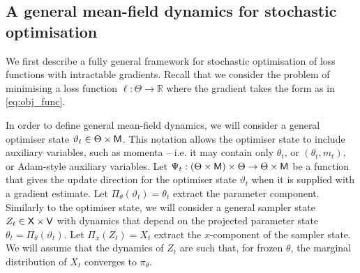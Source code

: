 \subsection{A general mean-field dynamics for stochastic optimisation}
We first describe a fully general framework for stochastic optimisation of loss functions with intractable gradients. Recall that we consider the problem of minimising a loss function $\ell:\Theta\rightarrow\mathbb{R}$ where the gradient takes the form as in \eqref{eq:obj_func}.

In order to define general mean-field dynamics, we will consider a general optimiser state $\vartheta_t \in \Theta \times {\mathsf{M}}$. This notation allows the optimiser state to include auxiliary variables, such as momenta -- i.e. it may contain only $\theta_t$, or $(\theta_t,m_t)$, or Adam-style auxiliary variables. Let $\Psi_t:(\Theta \times {\mathsf{M}})\times\Theta \rightarrow \Theta \times {\mathsf{M}}$ be a function that gives the update direction for the optimiser state $\vartheta_t$ when it is supplied with a gradient estimate.  Let $\Pi_\theta(\vartheta_t)=\theta_t$ extract the parameter component. Similarly to the optimiser state, we will consider a general sampler state $Z_t \in {\mathsf{X}} \times {\mathsf{V}}$ with dynamics that depend on the projected parameter state $\theta_t=\Pi_\theta(\vartheta_t)$. Let $\Pi_x(Z_t)=X_t$ extract the $x$-component of the sampler state. We will assume that the dynamics of $Z_t$ are such that, for frozen $\theta$, the marginal distribution of $X_t$ converges to $\pi_\theta$.

